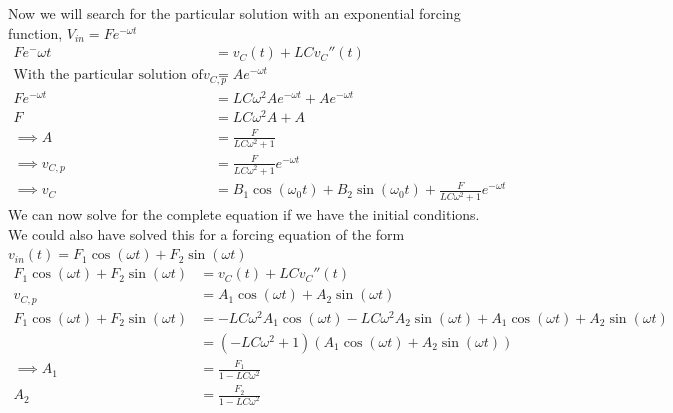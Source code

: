 \documentclass[nobib]{tufte-handout}
\begin{document}
Now we will search for the particular solution with an exponential forcing function, $V_{in} = Fe^{-\omega t}$
\begin{align*}
    Fe^-{\omega t}                                            & = v_C(t)+LCv_C''(t)                                                           \\
    \text{With the particular solution of the form }  v_{C,p} & = Ae^{-\omega t}                                                              \\
    Fe^{-\omega t}                                            & = LC\omega^2Ae^{-\omega t}+ Ae^{-\omega t}                                    \\
    F                                                         & = LC\omega^2A+A                                                               \\
    \implies A                                                & = \frac{F}{LC \omega^2+1}                                                     \\
    \implies v_{C,p}                                          & = \frac{F}{LC\omega^2+1}e^{-\omega t}                                         \\
    \implies v_C                                              & = B_1\cos(\omega_0t)+B_2\sin(\omega_0t) + \frac{F}{LC\omega^2+1}e^{-\omega t}
\end{align*}
We can now solve for the complete equation if we have the initial conditions.\\
We could also have solved this for a forcing equation of the form $v_{in}(t) = F_1\cos(\omega t)+F_2\sin(\omega t)$
\begin{align*}
    F_1\cos(\omega t)+F_2\sin(\omega t) & = v_C(t)+LCv_C''(t)                                                                                \\
    v_{C,p}                             & = A_1\cos(\omega t)+ A_2\sin(\omega t)                                                             \\
    F_1\cos(\omega t)+F_2\sin(\omega t) & = -LC\omega^2A_1\cos(\omega t)-LC\omega^2A_2\sin(\omega t) + A_1\cos(\omega t)+ A_2 \sin(\omega t) \\
                                        & = (-LC\omega^2+1)(A_1 \cos(\omega t)+A_2\sin(\omega t))                                            \\
    \implies A_1                        & = \frac{F_1}{1-LC\omega^2}                                                                         \\
    A_2                                 & = \frac{F_2}{1-LC\omega^2}
\end{align*}
\end{document}
